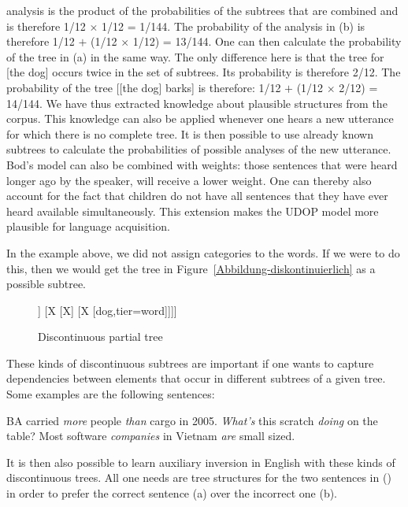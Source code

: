 analysis is the product of the probabilities of the subtrees that are combined and is therefore 1/12 $\times$ 1/12 = 1/144.
The probability of the analysis in (b) is therefore 1/12 $+$ (1/12 $\times$ 1/12) = 13/144.
One can then calculate the probability of the tree in (a) in the same way. The only difference here is that the tree for
[the dog] occurs twice in the set of subtrees. Its probability is therefore
 2/12. The probability of the tree [[the dog] barks] is therefore:
 1/12 $+$ (1/12 $\times$ 2/12) = 14/144. We have thus extracted knowledge about plausible structures from the corpus. This knowledge can
also  be applied whenever one hears a new utterance for which there is no complete tree. It is then possible to use already known
 subtrees to calculate the probabilities of possible analyses of the new utterance.
Bod's model can also be combined with weights: those sentences that were heard longer ago by the speaker, will receive a lower weight.
One can thereby also account for the fact that children do not  have all sentences that they have ever heard available simultaneously. 
This extension makes the UDOP model more plausible for language acquisition.

In the example above, we did not assign categories to the words. If we were to do this, then we
would get the tree in Figure~\vref{Abbildung-diskontinuierlich} as a possible
subtree.
\begin{figure}
\centering
\begin{forest}
[X
	[X
		[watch,tier=word]]
	[X
		[X]
		[X
			[dog,tier=word]]]]
\end{forest}
\caption{\label{Abbildung-diskontinuierlich}Discontinuous partial tree}
\end{figure}%
These kinds of discontinuous subtrees are important if one wants to capture dependencies between elements that occur in different subtrees
of a given tree. Some examples are the following sentences:

\eal
\ex BA carried \emph{more} people \emph{than} cargo in 2005.
\ex \emph{What's} this scratch \emph{doing} on the table?
\ex Most software \emph{companies} in Vietnam \emph{are} small sized.
\zl

\noindent
It is then also possible to learn auxiliary inversion in English with these kinds of discontinuous
trees. All one needs are tree structures for the two sentences in () in order to prefer the correct sentence (a) over the incorrect one (b).

